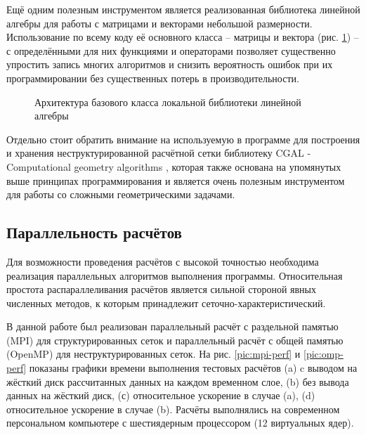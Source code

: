 Ещё одним полезным инструментом является реализованная библиотека линейной алгебры для работы с матрицами и векторами небольшой размерности. Использование по всему коду её основного класса -- матрицы и вектора (рис. \ref{pic:uml-linal}) -- с определёнными для них функциями и операторами позволяет существенно упростить запись многих алгоритмов и снизить вероятность ошибок при их программировании без существенных потерь в производительности.

\begin{figure}[H]
	\caption{Архитектура базового класса локальной библиотеки линейной алгебры}
	\label{pic:uml-linal}
\end{figure}

Отдельно стоит обратить внимание на используемую в программе для построения и хранения неструктурированной расчётной сетки библиотеку CGAL - Computational geometry algorithms \cite{cgal}, которая также основана на упомянутых выше принципах программирования и является очень полезным инструментом для работы со сложными геометрическими задачами.

\subsection{Параллельность расчётов}
Для возможности проведения расчётов с высокой точностью необходима реализация параллельных алгоритмов выполнения программы. Относительная простота распараллеливания расчётов является сильной стороной явных численных методов, к которым принадлежит сеточно\hyp{}характеристический.

В данной работе был реализован параллельный расчёт с раздельной памятью (MPI) для структурированных сеток и параллельный расчёт с общей памятью (OpenMP) для неструктурированных сеток. На рис. \ref{pic:mpi-perf} и \ref{pic:omp-perf} показаны графики времени выполнения тестовых расчётов (a) c выводом на жёсткий диск рассчитанных данных на каждом временном слое, (b) без вывода данных на жёсткий диск, (с) относительное ускорение в случае (a), (d) относительное ускорение в случае (b). Расчёты выполнялись на современном персональном компьютере с шестиядерным процессором (12 виртуальных ядер).

